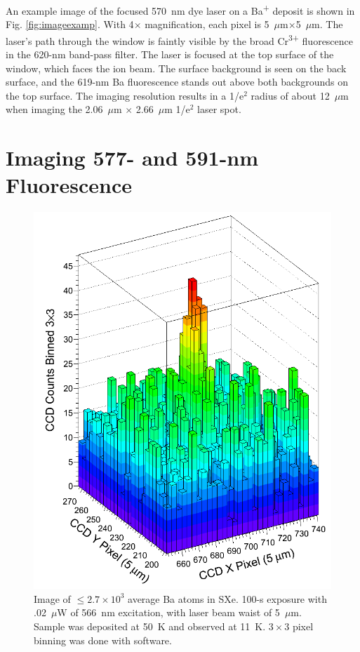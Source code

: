 An example image of the focused 570~nm dye laser on a Ba\textsuperscript{+} deposit is shown in Fig. \ref{fig:imageexamp}.  With 4$\times$ magnification, each pixel is 5~$\mu$m$\times$5~$\mu$m.  The laser's path through the window is faintly visible by the broad Cr\textsuperscript{3+} fluorescence in the 620-nm band-pass filter.  The laser is focused at the top surface of the window, which faces the ion beam.  The surface background is seen on the back surface, and the 619-nm Ba fluorescence stands out above both backgrounds on the top surface.  The imaging resolution results in a 1/e$^{2}$ radius of about 12~$\mu$m when imaging the 2.06~$\mu$m $\times$ 2.66~$\mu$m 1/e$^{2}$ laser spot.




\section{Imaging 577- and 591-nm Fluorescence}
\label{sec:imaging590and577}

\begin{figure} %
        \centering
                \includegraphics[width=.6\textwidth]{figures/image_1e4.png}
                \caption{Image of $\leq 2.7 \times 10^{3}$ average Ba atoms in SXe.  100-s exposure with .02~$\mu$W of 566~nm excitation, with laser beam waist of 5~$\mu$m.  Sample was deposited at 50~K and observed at 11~K.  $3 \times 3$ pixel binning was done with software.}
\label{fig:image590s}
\end{figure}

